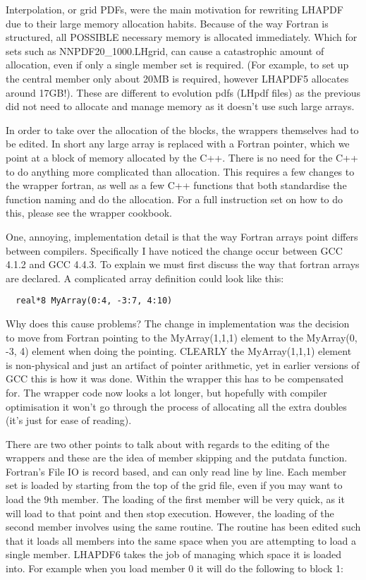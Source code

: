 Interpolation, or grid PDFs, were the main motivation for rewriting LHAPDF
due to their large memory allocation habits. Because of the way Fortran is
structured, all POSSIBLE necessary memory is allocated immediately. Which
for sets such as NNPDF20\_1000.LHgrid, can cause a catastrophic amount of
allocation, even if only a single member set is required. (For example,
to set up the central member only about 20MB is required, however LHAPDF5
allocates around 17GB!). These are different to evolution pdfs (LHpdf files)
as the previous did not need to allocate and manage memory as it doesn't use
such large arrays.

In order to take over the allocation of the blocks, the wrappers themselves
had to be edited. In short any large array is replaced with a Fortran
pointer, which we point at a block of memory allocated by the C++. There is
no need for the C++ to do anything more complicated than allocation. This
requires a few changes to the wrapper fortran, as well as a few C++
functions that both standardise the function naming and do the allocation.
For a full instruction set on how to do this, please see the wrapper
cookbook.

One, annoying, implementation detail is that the way Fortran arrays point
differs between compilers. Specifically I have noticed the change occur
between GCC 4.1.2 and GCC 4.4.3. To explain we must first discuss the way
that fortran arrays are declared. A complicated array definition could look
like this:

\begin{verbatim}
  real*8 MyArray(0:4, -3:7, 4:10)
\end{verbatim}

Why does this cause problems? The change in implementation was the decision
to move from Fortran pointing to the MyArray(1,1,1) element to the
MyArray(0, -3, 4) element when doing the pointing. CLEARLY the 
MyArray(1,1,1) element is non-physical and just an artifact of pointer
arithmetic, yet in earlier versions of GCC this is how it was done.
Within the wrapper this has to be compensated for. The wrapper code now
looks a lot longer, but hopefully with compiler optimisation it won't go
through the process of allocating all the extra doubles (it's just for ease
of reading).

There are two other points to talk about with regards to the editing of the
wrappers and these are the idea of member skipping and the putdata function.
Fortran's File IO is record based, and can only read line by line. Each
member set is loaded by starting from the top of the grid file, even if
you may want to load the 9th member. The loading of the first member will be
very quick, as it will load to that point and then stop execution. However,
the loading of the second member involves using the same routine. The
routine has been edited such that it loads all members into the same space
when you are attempting to load a single member. LHAPDF6 takes the job of
managing which space it is loaded into. For example when you load member 0
it will do the following to block 1:

